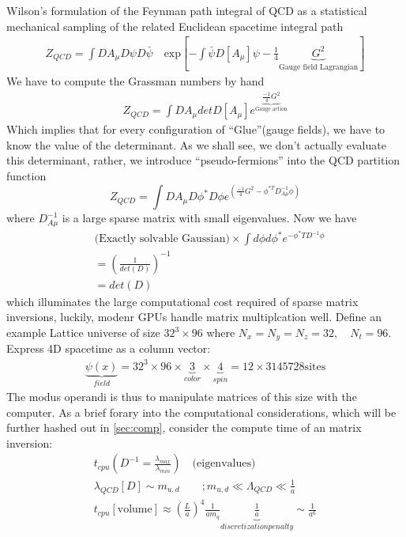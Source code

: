 Wilson's formulation of the Feynman path integral of QCD as a statistical mechanical sampling of the related Euclidean spacetime integral path 
\begin{align}
    Z_{QCD} = \int DA_\mu D\psi D\bar{\psi} \quad \text{exp}\left[-\int \bar{\psi}D[A_\mu]\psi - \frac{1}{4}\underbrace{G^2}_{\text{Gauge field Lagrangian}}\right]
\end{align}
We have to compute the Grassman numbers by hand 
\begin{align}
    Z_{QCD} = \int DA_\mu det D[A_\mu]e^{\underbrace{\frac{-1}{4}G^2}_{\text{Gauge action}}}
\end{align}
Which implies that for every configuration of ``Glue''(gauge fields), we have to know the value of the determinant. As we shall see, we don't actually evaluate this determinant, rather, we introduce ``pseudo-fermions'' into the QCD partition function 
\begin{equation}
    Z_{QCD} = \int DA_\mu D\phi^* D\phi e^{\left(\frac{-1}{4}G^2 - \phi^{*T}D_{A\mu}^{-1}\phi\right)}
\end{equation} where $D_{A\mu}^{-1}$ is a large sparse matrix with small eigenvalues. Now we have 
\begin{align}
    & \text{(Exactly solvable Gaussian)} \times \int d\phi d\phi^* e^{-\phi^*T D^{-1}\phi} \\ 
    &= \left(\frac{1}{det(D)}\right)^{-1} \\
    &= det(D)
\end{align}
which illuminates the large computational cost required of sparse matrix inversions, luckily, modenr GPUs handle matrix multiplcation well. Define an example Lattice universe of size $32^3 \times 96$ where $N_x=N_y=N_z = 32, \quad N_t=96$. Express 4D spacetime as a column vector: 
\begin{align}
   \underbrace{\psi(x)}_{field} = 32^3 \times 96 \times \underbrace{3}_{color} \times \underbrace{4}_{spin} = 12 \times 3145728 \text{sites} 
\end{align}
The modus operandi is thus to manipulate matrices of this size with the computer. 
As a brief forary into the computational considerations, which will be further hashed out in \ref{sec:comp}, consider the compute time of an matrix inversion: 
\begin{align}
    t_{cpu}(D^{-1} = \frac{\lambda_{max}}{\lambda_{min}}) \quad \text{(eigenvalues)} \\ 
    \lambda_{QCD}[D] \sim m_{u,d} \qquad ; m_{u,d} \ll \Lambda_{QCD} \ll \frac{1}{a} \\
    t_{cpu}[\text{volume}] \approx \left(\frac{L}{a}\right)^4 \frac{1}{am_q} \underbrace{\frac{1}{a}}_{discretization penalty} \sim \frac{1}{a^6}
\end{align}  
